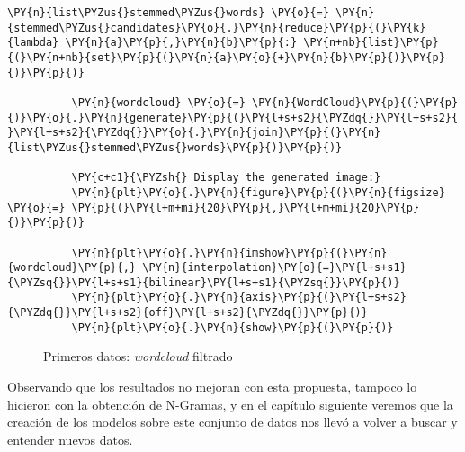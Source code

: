                   
              \begin{tcolorbox}[breakable, size=fbox, boxrule=1pt, pad at break*=1mm,colback=cellbackground, colframe=cellborder]
          \begin{Verbatim}[commandchars=\\\{\}]
          \PY{n}{list\PYZus{}stemmed\PYZus{}words} \PY{o}{=} \PY{n}{stemmed\PYZus{}candidates}\PY{o}{.}\PY{n}{reduce}\PY{p}{(}\PY{k}{lambda} \PY{n}{a}\PY{p}{,}\PY{n}{b}\PY{p}{:} \PY{n+nb}{list}\PY{p}{(}\PY{n+nb}{set}\PY{p}{(}\PY{n}{a}\PY{o}{+}\PY{n}{b}\PY{p}{)}\PY{p}{)}\PY{p}{)}
          
          \PY{n}{wordcloud} \PY{o}{=} \PY{n}{WordCloud}\PY{p}{(}\PY{p}{)}\PY{o}{.}\PY{n}{generate}\PY{p}{(}\PY{l+s+s2}{\PYZdq{}}\PY{l+s+s2}{ }\PY{l+s+s2}{\PYZdq{}}\PY{o}{.}\PY{n}{join}\PY{p}{(}\PY{n}{list\PYZus{}stemmed\PYZus{}words}\PY{p}{)}\PY{p}{)}
          
          \PY{c+c1}{\PYZsh{} Display the generated image:}
          \PY{n}{plt}\PY{o}{.}\PY{n}{figure}\PY{p}{(}\PY{n}{figsize} \PY{o}{=} \PY{p}{(}\PY{l+m+mi}{20}\PY{p}{,}\PY{l+m+mi}{20}\PY{p}{)}\PY{p}{)}
          
          \PY{n}{plt}\PY{o}{.}\PY{n}{imshow}\PY{p}{(}\PY{n}{wordcloud}\PY{p}{,} \PY{n}{interpolation}\PY{o}{=}\PY{l+s+s1}{\PYZsq{}}\PY{l+s+s1}{bilinear}\PY{l+s+s1}{\PYZsq{}}\PY{p}{)}
          \PY{n}{plt}\PY{o}{.}\PY{n}{axis}\PY{p}{(}\PY{l+s+s2}{\PYZdq{}}\PY{l+s+s2}{off}\PY{l+s+s2}{\PYZdq{}}\PY{p}{)}
          \PY{n}{plt}\PY{o}{.}\PY{n}{show}\PY{p}{(}\PY{p}{)}
          \end{Verbatim}
          \end{tcolorbox}
          
     
              
              \begin{figure}[!ht]
              	\centering
                    	\caption{Primeros datos: \textit{wordcloud} filtrado}
                    	\label{fig:wordcloudmalo2}
              \end{figure}
              
              
              
              
 Observando que los resultados no mejoran con esta propuesta, tampoco lo hicieron con la obtención de N-Gramas, y en el capítulo siguiente veremos que la creación de los modelos sobre este conjunto de datos nos llevó a volver a buscar y entender nuevos datos.
 
